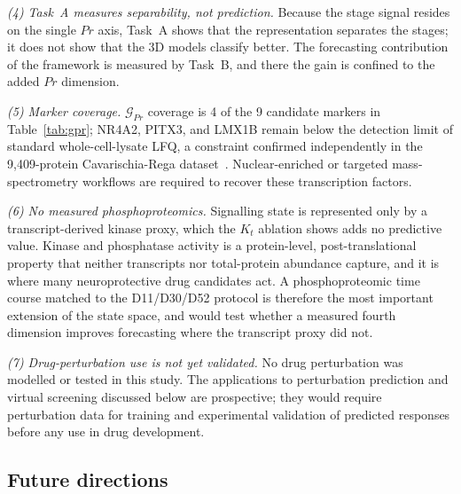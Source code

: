 \documentclass[5p,times,twocolumn]{elsarticle}
\newcommand{\rtag}[1]{}
\newcommand{\rev}[2]{\rtag{#1}#2}
\newenvironment{revblock}[1]{\par\rtag{#1}\ignorespaces}{\par}
\begin{document}
\begin{revblock}{R1.8,R2.12}
  \textit{(4) Task~A measures separability, not prediction.}
  Because the stage signal resides on the single $Pr$ axis, Task~A
  shows that the representation separates the stages; it does not
  show that the 3D models classify better. The forecasting
  contribution of the framework is measured by Task~B, and there
  the gain is confined to the added $Pr$ dimension.
\end{revblock}

\rev{AC}{\textit{(5) Marker coverage.}}
$\mathcal{G}_{Pr}$ coverage is \rev{AC}{4 of the 9 candidate
  markers in Table~\ref{tab:gpr}};
NR4A2, PITX3, and LMX1B remain below the detection limit of
standard whole-cell-lysate LFQ, a constraint confirmed
independently in the 9,409-protein Cavarischia-Rega
dataset~\cite{cavarischia2024proteome}.
Nuclear-enriched or targeted mass-spectrometry workflows are
required to recover these transcription factors.

\begin{revblock}{R1.12}
  \textit{(6) No measured phosphoproteomics.} Signalling state is
  represented only by a transcript-derived kinase proxy, which the
  $K_t$ ablation shows adds no predictive value. Kinase and
  phosphatase activity is a protein-level, post-translational
  property that neither transcripts nor total-protein abundance
  capture, and it is where many neuroprotective drug candidates
  act. A phosphoproteomic time course matched to the D11/D30/D52
  protocol is therefore the most important extension of the state
  space, and would test whether a measured fourth dimension
  improves forecasting where the transcript proxy did not.
\end{revblock}

\begin{revblock}{R2.20}
  \textit{(7) Drug-perturbation use is not yet validated.} No drug
  perturbation was modelled or tested in this study. The
  applications to perturbation prediction and virtual screening
  discussed below are prospective; they would require
  perturbation data for training and experimental validation of
  predicted responses before any use in drug development.
\end{revblock}

\subsection{\textbf{Future directions}}
\end{document}
